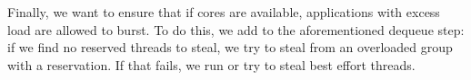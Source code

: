 Finally, we want to ensure that if cores are available, applications with excess
load are allowed to burst. To do this, we add to the aforementioned dequeue
step: if we find no reserved threads to steal, we try to steal from an
overloaded group with a reservation. If that fails, we run or try to steal best
effort threads.




